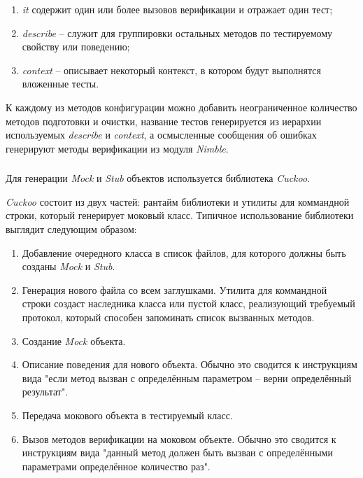 \begin{enumerate}
	\item \textit{it} содержит один или более вызовов верификации и отражает один тест;
	\item \textit{describe} -- служит для группировки остальных методов по тестируемому свойству или поведению;
	\item \textit{context} -- описывает некоторый контекст, в котором будут выполнятся вложенные тесты.
\end{enumerate}

К каждому из методов конфигурации можно добавить неограниченное количество методов подготовки и очистки, название тестов генерируется из иерархии используемых \textit{describe} и \textit{context}, а осмысленные сообщения об ошибках генерируют методы верификации из модуля \textit{Nimble}.

\subsubsection{}
\label{sec:testing:tech:cuckoo}
Для генерации \textit{Mock} и \textit{Stub} объектов используется библиотека \textit{Cuckoo}.

\textit{Cuckoo} состоит из двух частей: рантайм библиотеки и утилиты для коммандной строки, который генерирует моковый класс. Типичное использование библиотеки выглядит следующим образом:

\begin{enumerate}
	\item Добавление очередного класса в список файлов, для которого должны быть созданы \textit{Mock} и \textit{Stub}.
	\item Генерация нового файла со всем заглушками. Утилита для коммандной строки создаст наследника класса или пустой класс, реализующий требуемый протокол, который способен запоминать список вызванных методов.
	\item Создание \textit{Mock} объекта.
	\item Описание поведения для нового объекта. Обычно это сводится к инструкциям вида "если метод вызван с определённым параметром -- верни определённый результат".
	\item Передача мокового объекта в тестируемый класс.
	\item Вызов методов верификации на моковом объекте. Обычно это сводится к инструкциям вида "данный метод должен быть вызван с определёнными параметрами определённое количество раз".
\end{enumerate}